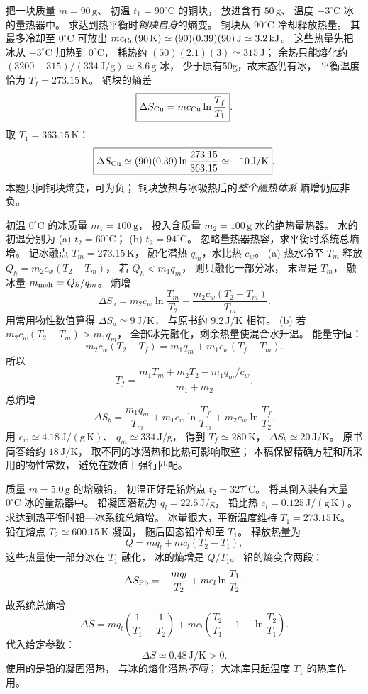 把一块质量 $m=90\,\mathrm g$、
初温 $t_1=90^\circ\mathrm C$ 的铜块，
放进含有 $50\,\mathrm g$、
温度 $-3^\circ\mathrm C$ 冰的量热器中。
求达到热平衡时\emph{铜块自身}的熵变。
\exsolution
铜块从 $90^\circ\mathrm C$ 冷却释放热量。
其最多冷却至 $0^\circ\mathrm C$ 可放出
$m c_{\rm Cu}(90\,\mathrm K)
\simeq(90)(0.39)(90)\,\mathrm J
\simeq3.2\,\mathrm{kJ}$。
这些热量先把冰从 $-3^\circ\mathrm C$
加热到 $0^\circ\mathrm C$，
耗热约
$(50)(2.1)(3)\simeq315\,\mathrm J$；
余热只能熔化约
$(3200-315)/(334\,\mathrm{J/g})
\simeq8.6\,\mathrm g$ 冰，
少于原有50g，故末态仍有冰，
平衡温度恰为 $T_f=273.15\,\mathrm K$。
铜块的熵差
\[
\boxed{\Delta S_{\rm Cu}=
m c_{\rm Cu}\ln\frac{T_f}{T_1}}.
\]
取 $T_1=363.15\,\mathrm K$：
\[
\boxed{\Delta S_{\rm Cu}\simeq
(90)(0.39)\ln\frac{273.15}{363.15}
\simeq-10\,\mathrm{J/K}}.
\]
\excheck 本题只问铜块熵变，可为负；
铜块放热与冰吸热后的\emph{整个隔热体系}
熵增仍应非负。

初温 $0^\circ\mathrm C$ 的冰质量
$m_1=100\,\mathrm g$，
投入含质量
$m_2=100\,\mathrm g$ 水的绝热量热器。
水的初温分别为
(a) $t_2=60^\circ\mathrm C$；
(b) $t_2=94^\circ\mathrm C$。
忽略量热器热容，求平衡时系统总熵增。
\exsolution
记冰融点 $T_m=273.15\,\mathrm K$，
融化潜热 $q_m$，水比热 $c_w$。
(a) 热水冷至 $T_m$ 释放
$Q_h=m_2c_w(T_2-T_m)$，
若
$Q_h<m_1q_m$，
则只融化一部分冰，
末温是 $T_m$，
融冰量 $m_{\rm melt}=Q_h/q_m$。
熵增
\[
\boxed{\Delta S_a=
m_2c_w\ln\frac{T_m}{T_2}
+\frac{m_2c_w(T_2-T_m)}{T_m}}.
\]
用常用物性数值算得
$\Delta S_a\simeq9\,\mathrm{J/K}$，
与原书约 $9.2\,\mathrm{J/K}$ 相符。
(b) 若
$m_2c_w(T_2-T_m)>m_1q_m$，
全部冰先融化，剩余热量使混合水升温。
能量守恒：
\[
m_2c_w(T_2-T_f)=m_1q_m+
m_1c_w(T_f-T_m).
\]
所以
\[
\boxed{T_f=\frac{m_1T_m+m_2T_2-m_1q_m/c_w}
{m_1+m_2}}.
\]
总熵增
\[
\boxed{\Delta S_b=
\frac{m_1q_m}{T_m}
+m_1c_w\ln\frac{T_f}{T_m}
+m_2c_w\ln\frac{T_f}{T_2}}.
\]
用 $c_w\simeq4.18\,\mathrm{J/(g\,K)}$、
$q_m\simeq334\,\mathrm{J/g}$，
得到 $T_f\simeq280\,\mathrm K$，
$\Delta S_b\simeq20\,\mathrm{J/K}$。
\excheck 原书简答给约 $18\,\mathrm{J/K}$，
取不同的冰潜热和比热可影响取整；
本稿保留精确方程和所采用的物性常数，
避免在数值上强行匹配。

质量 $m=5.0\,\mathrm g$ 的熔融铅，
初温正好是铅熔点
$t_2=327^\circ\mathrm C$。
将其倒入装有大量
$0^\circ\mathrm C$ 冰的量热器中。
铅凝固潜热为
$q_l=22.5\,\mathrm{J/g}$，
铅比热
$c_l=0.125\,\mathrm{J/(g\,K)}$。
求达到热平衡时铅—冰系统总熵增。
\exsolution
冰量很大，平衡温度维持
$T_1=273.15\,\mathrm K$。
铅在熔点
$T_2\simeq600.15\,\mathrm K$ 凝固，
随后固态铅冷却至 $T_1$。
释放热量为
\[
Q=m q_l+mc_l(T_2-T_1),
\]
这些热量使一部分冰在 $T_1$ 融化，
冰的熵增是 $Q/T_1$。
铅的熵变含两段：
\[
\Delta S_{\rm Pb}
=-\frac{mq_l}{T_2}
+mc_l\ln\frac{T_1}{T_2}.
\]
故系统总熵增
\[
\boxed{\Delta S=
mq_l\left(\frac1{T_1}-\frac1{T_2}\right)
+mc_l\left(\frac{T_2}{T_1}-1
-\ln\frac{T_2}{T_1}\right)}.
\]
代入给定参数：
\[
\boxed{\Delta S\simeq0.48\,\mathrm{J/K}>0}.
\]
\excheck 使用的是铅的凝固潜热，
与冰的熔化潜热\emph{不同}；
大冰库只起温度 $T_1$ 的热库作用。


